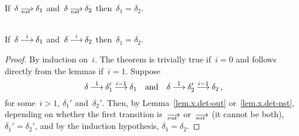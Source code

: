 \begin{lemma}
  \label{lem.x.det-nst}
  If~$\delta\nst\delta_1$ and~$\delta\nst\delta_2$ then~$\delta_1=\delta_2$.
\end{lemma}

\begin{theorem}[Determinism]
  \label{thm.x.det}\strut\\
  If~$\delta\trans[i]\delta_1$ and~$\delta\trans[i]\delta_2$
  then~$\delta_1=\delta_2$.
\end{theorem}
\begin{proof}
  By induction on~$i$.  The theorem is trivially true if~$i=0$ and follows
  directly from the lemmas if~$i=1$.  Suppose
  \[
    \delta\trans[1]\delta_1'\trans[i-1]\delta_1
    \quad\text{and}\quad
    \delta\trans[1]\delta_2'\trans[i-1]\delta_2\,,
  \]
  for some~$i>1$, $\delta_1'$ and~$\delta_2'$.
  Then, by Lemma~\ref{lem.x.det-out} or~\ref{lem.x.det-nst}, depending on
  whether the first transition is~$\out$ or~$\nst$ (it cannot be both),
  $\delta_1'=\delta_2'$, and by the induction hypothesis,
  $\delta_1=\delta_2$.
\end{proof}




